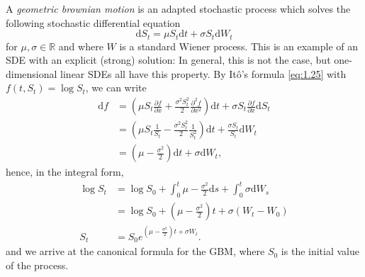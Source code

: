 \begin{definition}
    A \emph{geometric brownian motion} is an adapted stochastic process which solves 
    the following stochastic differential equation
    \begin{equation}
        \mathrm dS_t=\mu S_t\mathrm dt + \sigma S_t\mathrm dW_t
    \end{equation}
    for $\mu,\sigma\in\mathbb{R}$ and where $W$ is a standard Wiener process. This
    is an example of an SDE with an explicit (strong) solution: In general, this 
    is not the case, but one-dimensional linear SDEs all have this property.
    By It\^{o}'s formula \eqref{eq:1.25} with $f(t,S_t)=\log S_t$, we can write
    \begin{align*}
        \mathrm df&=\left(\mu S_t\frac{\partial f}{\partial x}+\frac{\sigma^2S_t^2}{2}\frac{\partial^2f}{\partial x^2}\right)\mathrm dt +\sigma S_t\frac{\partial f}{\partial x}\mathrm dS_t\\
        &=\left(\mu S_t\frac{1}{S_t}-\frac{\sigma^2S_t^2}{2}\frac{1}{S_t^2}\right)\mathrm dt+\frac{\sigma S_t}{S_t}\mathrm dW_t\\
        &=\left(\mu-\frac{\sigma^2}{2}\right)\mathrm dt+\sigma\mathrm dW_t,
    \end{align*}
    hence, in the integral form,
    \begin{align*}
        \log S_t&=\log S_0+\int_0^t\mu-\frac{\sigma^2}{2}\mathrm ds+\int_0^t\sigma\mathrm dW_s\\
        &=\log S_0+\left(\mu-\frac{\sigma^2}{2}\right)t+\sigma(W_t-W_0)\\
        S_t&=S_0e^{\left(\mu-\frac{\sigma^2}{2}\right)t+\sigma W_t}.
    \end{align*}
    and we arrive at the canonical formula for the GBM, where $S_0$ is the initial 
    value of the process.
\end{definition}

